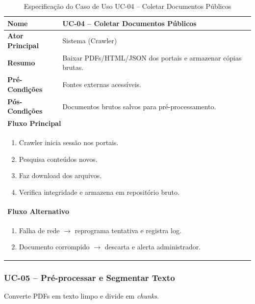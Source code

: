 \begin{table}[H]
\centering
\caption{Especificação do Caso de Uso UC-04 – Coletar Documentos Públicos}
\label{tab:uc04}
\begin{tabular}{|p{4cm}|p{11cm}|}
\hline
\textbf{Nome}        & UC-04 – Coletar Documentos Públicos \\ \hline
\textbf{Ator Principal} & Sistema (Crawler) \\ \hline
\textbf{Resumo}      & Baixar PDFs/HTML/JSON dos portais e armazenar cópias brutas. \\ \hline
\textbf{Pré-Condições} & Fontes externas acessíveis. \\ \hline
\textbf{Pós-Condições} & Documentos brutos salvos para pré-processamento. \\ \hline
\multicolumn{2}{|l|}{\textbf{Fluxo Principal}} \\ \hline
\multicolumn{2}{|p{15cm}|}{%
\begin{enumerate}[leftmargin=*]
  \item Crawler inicia sessão nos portais.
  \item Pesquisa conteúdos novos.
  \item Faz download dos arquivos.
  \item Verifica integridade e armazena em repositório bruto.
\end{enumerate}} \\ \hline
\multicolumn{2}{|l|}{\textbf{Fluxo Alternativo}} \\ \hline
\multicolumn{2}{|p{15cm}|}{%
\begin{enumerate}[label=\arabic*a.,leftmargin=*]
  \item Falha de rede $\rightarrow$ reprograma tentativa e registra log.
  \item Documento corrompido $\rightarrow$ descarta e alerta administrador.
\end{enumerate}} \\ \hline
\end{tabular}
\end{table}

\subsubsection{UC-05 – Pré-processar e Segmentar Texto}

\noindent
Converte PDFs em texto limpo e divide em \textit{chunks}.

